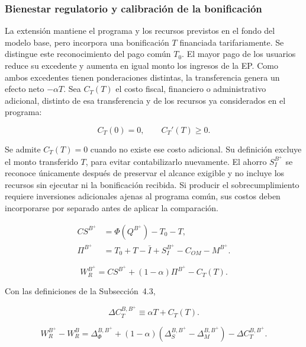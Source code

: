 \subsubsection{Bienestar regulatorio y calibración de la bonificación}

La extensión mantiene el programa y los recursos previstos en el fondo del modelo base, pero incorpora una bonificación \(T\) financiada tarifariamente. Se distingue este reconocimiento del pago común \(T_0\). El mayor pago de los usuarios reduce su excedente y aumenta en igual monto los ingresos de la EP. Como ambos excedentes tienen ponderaciones distintas, la transferencia genera un efecto neto \(-\alpha T\). Sea \(C_T(T)\) el costo fiscal, financiero o administrativo adicional, distinto de esa transferencia y de los recursos ya considerados en el programa:

\begin{equation}
\label{eq:costo_bonificacion_bplus}
C_T(0)=0,\qquad C_T'(T)\geq0.
\end{equation}

Se admite \(C_T(T)=0\) cuando no existe ese costo adicional. Su definición excluye el monto transferido \(T\), para evitar contabilizarlo nuevamente. El ahorro \(S_I^{B^+}\) se reconoce únicamente después de preservar el alcance exigible y no incluye los recursos sin ejecutar ni la bonificación recibida. Si producir el sobrecumplimiento requiere inversiones adicionales ajenas al programa común, sus costos deben incorporarse por separado antes de aplicar la comparación.

\begin{equation}
\label{eq:excedentes_bplus}
\begin{aligned}CS^{B^+}&=\Phi(Q^{B^+})-T_0-T,\\\Pi^{B^+}&=T_0+T-\bar I+S_I^{B^+}-C_{OM}-M^{B^+}.\end{aligned}
\end{equation}

\begin{equation}
\label{eq:bienestar_regulador_bplus}
W_R^{B^+}=CS^{B^+}+(1-\alpha)\Pi^{B^+}-C_T(T).
\end{equation}

Con las definiciones de la Subsección~4.3,

\begin{equation}
\label{eq:delta_p_bplus}
\Delta C_T^{B,B^+}\equiv\alpha T+C_T(T).
\end{equation}

\begin{equation}
\label{eq:diferencia_bienestar_bplus_b}
W_R^{B^+}-W_R^B=\Delta_\Phi^{B,B^+}+(1-\alpha)(\Delta_S^{B,B^+}-\Delta_M^{B,B^+})-\Delta C_T^{B,B^+}.
\end{equation}


